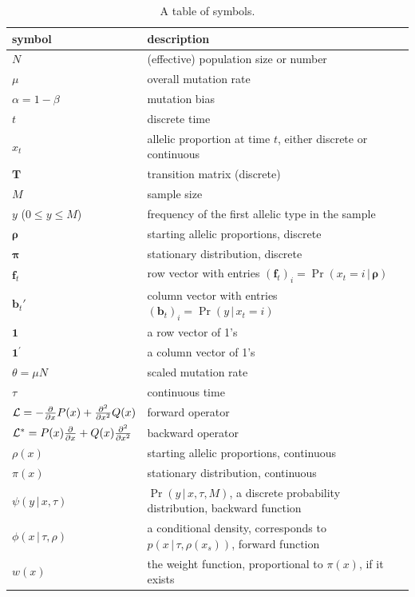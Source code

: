 \documentclass[preprint]{elsarticle}
\newcommand{\bs}[1]{\ensuremath{\boldsymbol{#1}}}
\newcommand\given{{\,|\,}}
\newcommand\x[1]{\ensuremath{x_{#1}}}
\newcommand\y{\ensuremath{y}}
\newcommand\fv[1]{\ensuremath{\mathbf{f}_{#1}}}
\newcommand\bv[1]{\ensuremath{\mathbf{b}_{#1}}}
\begin{document}
\begin{table}[ht]
\centering
\caption{A table of symbols.}
  \begin{tabular}{l|l}
  \toprule
    symbol& description\\
    \midrule
    $N$& (effective) population size or number\\
    $\mu$ &overall mutation rate\\
    $\alpha=1-\beta$ &mutation bias\\
    $t$& discrete time\\
    $\x{t}$ &allelic proportion at time $t$, either discrete or continuous\\
    $\mathbf{T}$& transition matrix (discrete)\\
    $M$&sample size\\
    $\y$ ($0 \le \y \le M$) &frequency of the first allelic type in the sample\\
    $\bs{\rho}$ &starting allelic proportions, discrete\\
    $\bs{\pi}$ &stationary distribution, discrete\\
    $\fv{t}$ &row vector with entries $(\fv{t})_{i} = \Pr(\x{t} = i\given \bs{\rho})$\\
    $\bv{t}'$ &column vector with entries $(\bv{t})_{i} = \Pr(\y\given \x{t} = i)$\\
    $\mathbf{1}$ &a row vector of 1's\\
    $\mathbf{1}^{'}$ &a column vector of 1's\\
    \midrule
    $\theta=\mu N$ &scaled mutation rate\\
    $\tau$&continuous time\\
    ${\cal L}=-\frac{\partial}{\partial x}P(x)+ \frac{\partial^2}{\partial x^2}Q(x)$ &forward operator\\
    ${\cal L}^{*}=P(x)\frac{\partial}{\partial x} +Q(x)\frac{\partial^2}{\partial x^2}$&backward operator\\
    $\rho(x)$ &starting allelic proportions, continuous\\
    $\pi(x)$ &stationary distribution, continuous\\
    $\psi(\y\given x,\tau)$ &$\Pr(\y\given x,\tau,M)$, a discrete probability distribution, backward function\\
    $\phi(x\given \tau,\rho)$ &a conditional density, corresponds to $p(x\given \tau,\rho(x_s))$,  forward function\\
    $w(x)$ &the weight function, proportional to $\pi(x)$, if it exists\\

\end{tabular}
\end{table}
\end{document}
